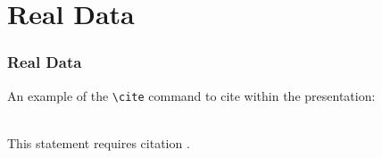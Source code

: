 \section{Real Data}

\begin{frame}[fragile] %
    \frametitle{Real Data}
    An example of the \verb|\cite| command to cite within the presentation:\\~
    
    This statement requires citation \cite{breiman1984classification}.
\end{frame}
    

